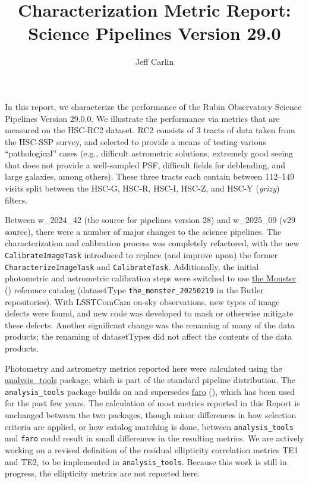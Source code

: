\documentclass[DM,toc,lsstdraft]{lsstdoc}
\title{Characterization Metric Report: Science Pipelines Version 29.0}
\author{%
Jeff Carlin
}
\date{\vcsDate}
\begin{document}
\maketitle

In this report, we characterize the performance of the Rubin Observatory Science Pipelines Version 29.0.0. We illustrate the performance via metrics that are measured on the HSC-RC2 dataset. RC2 consists of 3 tracts of data taken from the HSC-SSP survey, and selected to provide a means of testing various ``pathological'' cases (e.g., difficult astrometric solutions, extremely good seeing that does not provide a well-sampled PSF, difficult fields for deblending, and large galaxies, among others). These three tracts each contain between 112--149 visits split between the HSC-G, HSC-R, HSC-I, HSC-Z, and HSC-Y (\emph{grizy}) filters.

Between w\_2024\_42 (the source for pipelines version 28) and w\_2025\_09 (v29 source), there were a number of major changes to the science pipelines. The characterization and calibration process was completely refactored, with the new \texttt{CalibrateImageTask} introduced to replace (and improve upon) the former \texttt{CharacterizeImageTask} and \texttt{CalibrateTask}. Additionally, the initial photometric and astrometric calibration steps were switched to use \href{https://dmtn-277.lsst.io/}{the Monster} () reference catalog (datasetType \texttt{the\_monster\_20250219} in the Butler repositories). With LSSTComCam on-sky observations, new types of image defects were found, and new code was developed to mask or otherwise mitigate these defects. Another significant change was the renaming of many of the data products; the renaming of datasetTypes did not affect the contents of the data products.

Photometry and astrometry metrics reported here were calculated using the \href{https://github.com/lsst/analysis_tools}{analysis\_tools} package, which is part of the standard pipeline distribution. The \texttt{analysis\_tools} package builds on and supersedes \href{https://github.com/lsst/faro}{faro} (), which has been used for the past few years. The calculation of most metrics reported in this Report is unchanged between the two packages, though minor differences in how selection criteria are applied, or how catalog matching is done, between \texttt{analysis\_tools} and \texttt{faro} could result in small differences in the resulting metrics. We are actively working on a revised definition of the residual ellipticity correlation metrics TE1 and TE2, to be implemented in \texttt{analysis\_tools}. Because this work is still in progress, the ellipticity metrics are not reported here.
\end{document}
